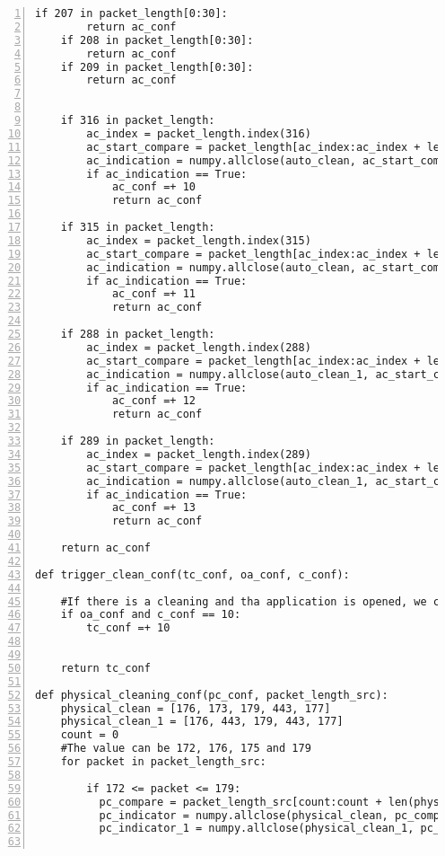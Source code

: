 \begin{lstlisting}[numbers=left]
    if 207 in packet_length[0:30]:
        return ac_conf
    if 208 in packet_length[0:30]:
        return ac_conf
    if 209 in packet_length[0:30]:
        return ac_conf


    if 316 in packet_length:
        ac_index = packet_length.index(316)
        ac_start_compare = packet_length[ac_index:ac_index + len(auto_clean)]
        ac_indication = numpy.allclose(auto_clean, ac_start_compare, atol= 1)
        if ac_indication == True:
            ac_conf =+ 10
            return ac_conf
    
    if 315 in packet_length:
        ac_index = packet_length.index(315)
        ac_start_compare = packet_length[ac_index:ac_index + len(auto_clean)]
        ac_indication = numpy.allclose(auto_clean, ac_start_compare, atol= 1)
        if ac_indication == True:
            ac_conf =+ 11
            return ac_conf

    if 288 in packet_length:
        ac_index = packet_length.index(288)
        ac_start_compare = packet_length[ac_index:ac_index + len(auto_clean_1)]
        ac_indication = numpy.allclose(auto_clean_1, ac_start_compare, atol= 1)
        if ac_indication == True:
            ac_conf =+ 12
            return ac_conf
        
    if 289 in packet_length:
        ac_index = packet_length.index(289)
        ac_start_compare = packet_length[ac_index:ac_index + len(auto_clean_1)]
        ac_indication = numpy.allclose(auto_clean_1, ac_start_compare, atol= 1)
        if ac_indication == True:
            ac_conf =+ 13
            return ac_conf
            
    return ac_conf   

def trigger_clean_conf(tc_conf, oa_conf, c_conf):
    
    #If there is a cleaning and tha application is opened, we can say that it is likely that is has been a triggered clean
    if oa_conf and c_conf == 10:
        tc_conf =+ 10


    return tc_conf

def physical_cleaning_conf(pc_conf, packet_length_src):
    physical_clean = [176, 173, 179, 443, 177]
    physical_clean_1 = [176, 443, 179, 443, 177]
    count = 0
    #The value can be 172, 176, 175 and 179
    for packet in packet_length_src:
        
        if 172 <= packet <= 179:
          pc_compare = packet_length_src[count:count + len(physical_clean)]
          pc_indicator = numpy.allclose(physical_clean, pc_compare, atol= 15)
          pc_indicator_1 = numpy.allclose(physical_clean_1, pc_compare, atol= 5)


\end{lstlisting}
